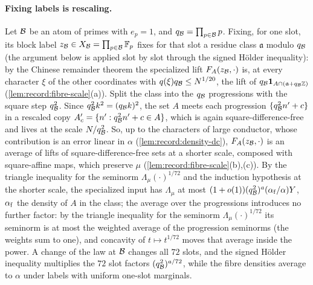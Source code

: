 \paragraph{Fixing labels is rescaling.}
Let $\mathcal B$ be an atom of primes with $e_p=1$, and $q_\mathcal B=\prod_{p\in\mathcal B}p$.
Fixing, for one slot, its block label
$z_\mathcal B\in X_\mathcal B=\prod_{p\in\mathcal B}\mathbb F_p$ fixes for that slot a residue
class $\mathfrak a$ modulo $q_\mathcal B$ (the argument below is applied
slot by slot through the signed H\"older inequality): by the Chinese remainder theorem the specialized
lift $F_A(z_\mathcal B,\cdot)$ is, at every character $\xi$ of the other coordinates
with $q(\xi)q_\mathcal B\le N^{1/20}$, the lift of $q_\mathcal B\mathbf 1_{A\cap(\mathfrak a+q_\mathcal B\mathbb Z)}$
(\cref{lem:record:fibre-scale}(a)). Split the class into the $q_\mathcal B$
progressions with the square step $q_\mathcal B^2$. Since $q_\mathcal B^2k^2=(q_\mathcal B k)^2$, the
set $A$ meets each progression $\{q_\mathcal B^2n'+c\}$ in a rescaled copy
$A'_c=\{n':q_\mathcal B^2n'+c\in A\}$, which is again square-difference-free and lives
at the scale $N/q_\mathcal B^2$. So, up to the characters of large conductor, whose
contribution is an error linear in $\alpha$ (\cref{lem:record:density-dc}),
$F_A(z_\mathcal B,\cdot)$ is an average of lifts of square-difference-free sets at a
shorter scale, composed with square-affine maps, which preserve $\mu$
(\cref{lem:record:fibre-scale}(b),(c)). By the triangle inequality for the
seminorm $\Lambda_\mu(\cdot)^{1/72}$ and the induction hypothesis at the shorter
scale, the specialized input has $\Lambda_\mu$ at most
$(1+o(1))(q_\mathcal B^2)^a(\alpha_{\rm f}/\alpha)Y$, $\alpha_{\rm f}$ the density of $A$ in the
class; the average over the progressions introduces no further
factor: by the triangle inequality for the seminorm
$\Lambda_\mu(\cdot)^{1/72}$ its seminorm is at most the weighted
average of the progression seminorms (the weights sum to one), and
concavity of $t\mapsto t^{1/72}$ moves that average inside the
power.
A change of the law at $\mathcal B$ changes all $72$ slots, and the signed H\"older
inequality multiplies the $72$ slot factors $(q_\mathcal B^2)^{a/72}$, while the
fibre densities average to $\alpha$ under labels with uniform one-slot
marginals.

